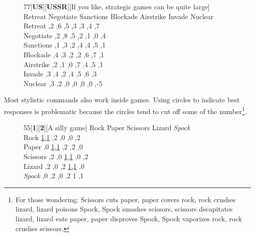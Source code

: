 \documentclass[10.5pt]{article}
\begin{document}
\begin{figure}[h]
\begin{center}
\begin{scriptsize}
\begin{game}{7}{7}[\textbf{US}][\textbf{USSR}][If you like, strategic games can be quite large]
          \> Retreat  \>  Negotiate  \> Sanctions    \> Blockade   \> Airstrike  \> Invade  \> Nuclear\\
Retreat   ,2      ,6        ,5          ,3        ,3        ,4     ,7  \\
Negotiate ,2      ,8        ,5          ,2        ,1        ,0     ,4  \\
Sanctions ,1      ,3        ,2          ,4        ,4        ,5     ,1  \\
Blockade  ,4      ,3        ,2          ,2        ,6        ,7     ,1  \\
Airstrike ,2      ,1        ,0          ,7        ,4        ,5     ,1  \\
Invade    ,3      ,4        ,2          ,4        ,5        ,6     ,3  \\
Nuclear   ,3      ,2        ,0          ,0        ,0        ,0     ,-5 \\
\end{game}
\end{scriptsize}
\end{center}
\end{figure}

Most stylistic commands also work inside games. Using circles to indicate best responses is problematic because the circles tend to cut off some of the number\footnote{For those wondering: Scissors cuts paper, paper covers rock, rock crushes lizard, lizard poisons Spock, Spock smashes scissors, scissors decapitates lizard, lizard eats paper, paper disproves Spock, Spock vaporizes rock, rock crushes scissors.}.

\begin{figure}[h!]
\begin{footnotesize}
 \begin{center}
\begin{game}{5}{5}[\textbf{1}][\textbf{2}][A silly game]
       \> \large{Rock}    \> Paper   \> Scissors \> Lizard \> \textit{Spock}  \\
 \large{Rock} \> \underline{1,1}  ,2  ,0 ,0 ,2 \\
 Paper ,0    \> \underline{1,1}  ,2 ,2 ,0 \\
 Scissors ,2 ,0 \> \underline{1,1} ,0 ,2 \\
 Lizard ,2  ,0 ,2 \> \underline{1,1} ,0 \\
 \textit{Spock} ,0 ,2 ,0 ,2 \> \textcircled{1},\textcircled{1} \\
\end{game}
\end{center}
\end{footnotesize}
\end{figure}
\end{document}
